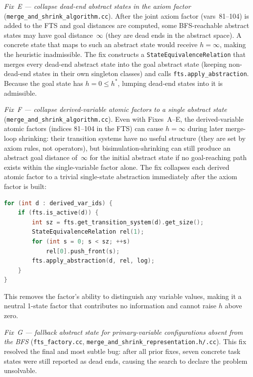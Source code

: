 \documentclass[11pt,a4paper]{article}
\begin{document}
    \emph{Fix~E --- collapse dead-end abstract states in the axiom factor}
    (\texttt{merge\_and\_shrink\_algorithm.cc}).
    After the joint axiom factor (vars~81--104) is added to the FTS and
    goal distances are computed, some BFS-reachable abstract states may have
    goal distance~$\infty$ (they are dead ends in the abstract space).
    A concrete state that maps to such an abstract state would receive
    $h = \infty$, making the heuristic inadmissible.
    The fix constructs a \texttt{StateEquivalenceRelation} that merges every
    dead-end abstract state into the goal abstract state (keeping non-dead-end
    states in their own singleton classes) and calls
    \texttt{fts.apply\_abstraction}.
    Because the goal state has $h = 0 \leq h^*$, lumping dead-end states into
    it is admissible.

    \emph{Fix~F --- collapse derived-variable atomic factors to a single abstract state}
    (\texttt{merge\_and\_shrink\_algorithm.cc}).
    Even with Fixes~A--E, the derived-variable atomic factors
    (indices 81--104 in the FTS) can cause $h = \infty$ during later
    merge-loop shrinking: their transition systems have no useful structure
    (they are set by axiom rules, not operators), but bisimulation-shrinking
    can still produce an abstract goal distance of~$\infty$ for the initial
    abstract state if no goal-reaching path exists within the single-variable
    factor alone.
    The fix collapses each derived atomic factor to a trivial single-state
    abstraction immediately after the axiom factor is built:
\begin{lstlisting}[language=C++]
for (int d : derived_var_ids) {
    if (fts.is_active(d)) {
        int sz = fts.get_transition_system(d).get_size();
        StateEquivalenceRelation rel(1);
        for (int s = 0; s < sz; ++s)
            rel[0].push_front(s);
        fts.apply_abstraction(d, rel, log);
    }
}
\end{lstlisting}
    This removes the factor's ability to distinguish any variable values,
    making it a neutral 1-state factor that contributes no information and
    cannot raise $h$ above zero.

    \emph{Fix~G --- fallback abstract state for primary-variable configurations absent from the BFS}
    (\texttt{fts\_factory.cc},
     \texttt{merge\_and\_shrink\_representation.h/.cc}).
    This fix resolved the final and most subtle bug: after all prior fixes,
    seven concrete task states were still reported as dead ends, causing the
    search to declare the problem unsolvable.
\end{document}

